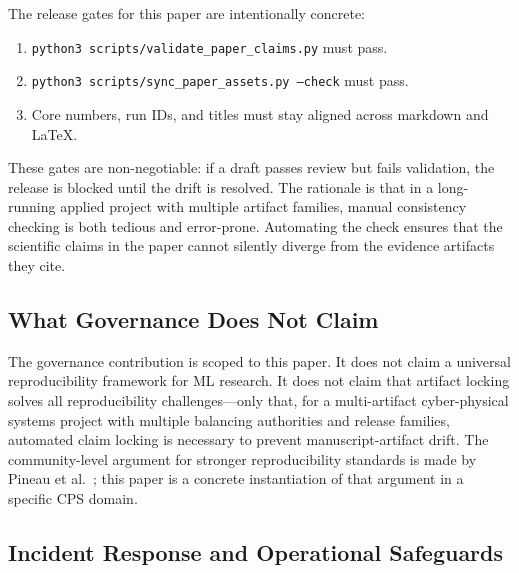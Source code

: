 \documentclass[11pt,a4paper]{article}
\begin{document}
The release gates for this paper are intentionally concrete:
\begin{enumerate}[leftmargin=*,topsep=2pt,itemsep=1pt]
  \item \texttt{python3 scripts/validate\_paper\_claims.py} must pass.
  \item \texttt{python3 scripts/sync\_paper\_assets.py --check} must pass.
  \item Core numbers, run IDs, and titles must stay aligned across markdown and LaTeX.
\end{enumerate}

These gates are non-negotiable: if a draft passes review but fails validation, the release is blocked until the drift is resolved. The rationale is that in a long-running applied project with multiple artifact families, manual consistency checking is both tedious and error-prone. Automating the check ensures that the scientific claims in the paper cannot silently diverge from the evidence artifacts they cite.

\subsection{What Governance Does Not Claim}

The governance contribution is scoped to this paper. It does not claim a universal reproducibility framework for ML research. It does not claim that artifact locking solves all reproducibility challenges---only that, for a multi-artifact cyber-physical systems project with multiple balancing authorities and release families, automated claim locking is necessary to prevent manuscript-artifact drift. The community-level argument for stronger reproducibility standards is made by Pineau et al.~\cite{pineau2021improving}; this paper is a concrete instantiation of that argument in a specific CPS domain.

\subsection{Incident Response and Operational Safeguards}
\end{document}
